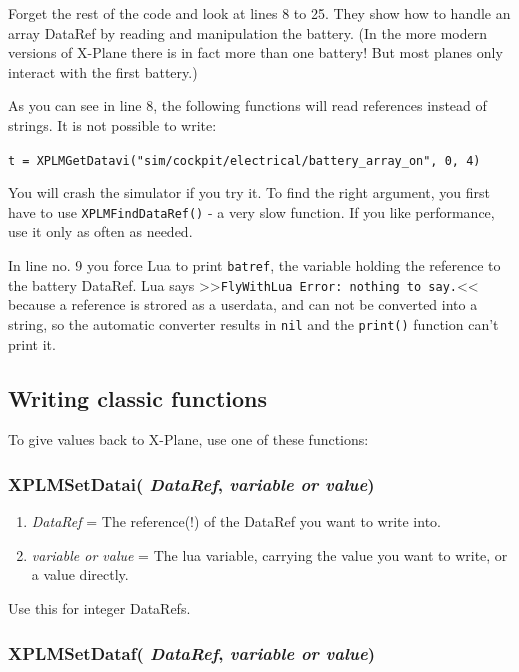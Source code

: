 \documentclass[11pt,parskip=half,a4paper]{scrartcl}
\begin{document}
Forget the rest of the code and look at lines 8 to 25. They show how to handle an array DataRef by reading and manipulation the battery. (In the more modern versions of X-Plane there is in fact more than one battery! But most planes only interact with the first battery.)

As you can see in line 8, the following functions will read references instead of strings. It is not possible to write:

\verb|t = XPLMGetDatavi("sim/cockpit/electrical/battery_array_on", 0, 4)|

You will crash the simulator if you try it. To find the right argument, you first have to use \verb|XPLMFindDataRef()| - a very slow function. If you like performance, use it only as often as needed.

In line no. 9 you force Lua to print \verb|batref|, the variable holding the reference to the battery DataRef. Lua says >>\verb|FlyWithLua Error: nothing to say.|<< because a reference is strored as a userdata, and can not be converted into a string, so the automatic converter results in \verb|nil| and the \verb|print()| function can't print it.

\newpage
\subsection{Writing classic functions}

To give values back to X-Plane, use one of these functions:

\subsubsection{XPLMSetDatai( \emph{DataRef}, \emph{variable or value})}

\begin{enumerate}
	\item \emph{DataRef} = The reference(!) of the DataRef you want to write into.
	\item \emph{variable or value} = The lua variable, carrying the value you want to write, or a value directly.
\end{enumerate}

Use this for integer DataRefs.

\subsubsection{XPLMSetDataf( \emph{DataRef}, \emph{variable or value})}
\end{document}
